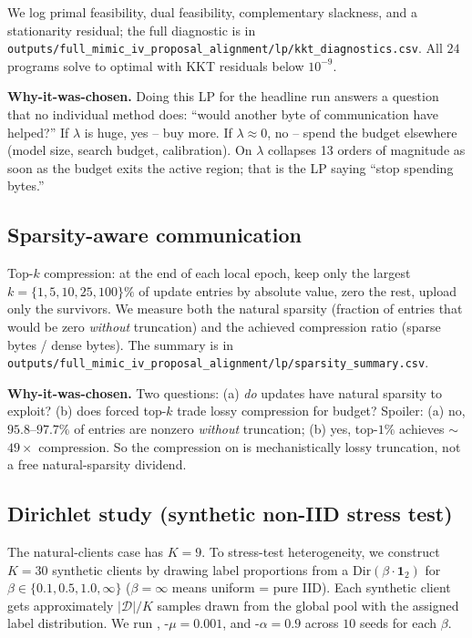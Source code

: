 We log primal feasibility, dual feasibility, complementary slackness, and a
stationarity residual; the full diagnostic is in
\texttt{outputs/full\_mimic\_iv\_proposal\_alignment/lp/kkt\_diagnostics.csv}.
All $24$ programs solve to optimal with KKT residuals below $10^{-9}$.

\textbf{Why-it-was-chosen.} Doing this LP for the headline run answers a
question that no individual method does: ``would another byte of communication
have helped?'' If $\lambda$ is huge, yes -- buy more. If $\lambda \!\approx\! 0$,
no -- spend the budget elsewhere (model size, search budget, calibration).
On \mimic{} $\lambda$ collapses 13 orders of magnitude as soon as the budget
exits the active region; that is the LP saying ``stop spending bytes.''

\subsection{Sparsity-aware communication}
Top-$k$ compression: at the end of each local epoch, keep only the largest
$k\!=\!\{1, 5, 10, 25, 100\}\%$ of update entries by absolute value, zero the rest,
upload only the survivors. We measure both the natural sparsity (fraction of
entries that would be zero \emph{without} truncation) and the achieved
compression ratio (sparse bytes / dense bytes). The summary is in
\texttt{outputs/full\_mimic\_iv\_proposal\_alignment/lp/sparsity\_summary.csv}.

\textbf{Why-it-was-chosen.} Two questions: (a) \emph{do} updates have natural
sparsity to exploit? (b) does forced top-$k$ trade lossy compression for
budget? Spoiler: (a) no, $95.8$--$97.7\%$ of entries are nonzero
\emph{without} truncation; (b) yes, top-$1\%$ achieves $\sim$$49\!\times$
compression. So the compression on \mimic{} is mechanistically lossy
truncation, not a free natural-sparsity dividend.

\subsection{Dirichlet study (synthetic non-IID stress test)}
The natural-clients case has $K \!=\! 9$. To stress-test heterogeneity, we
construct $K \!=\! 30$ synthetic clients by drawing label proportions from a
$\mathrm{Dir}(\beta\!\cdot\!\mathbf{1}_2)$ for $\beta \!\in\! \{0.1, 0.5, 1.0,
\infty\}$ ($\beta\!=\!\infty$ means uniform = pure IID). Each synthetic client
gets approximately $|\mathcal{D}|/K$ samples drawn from the global pool with
the assigned label distribution. We run \fedavg{}, \fedprox{}-$\mu\!=\!0.001$,
and \cvar{}-$\alpha\!=\!0.9$ across $10$ seeds for each $\beta$.

